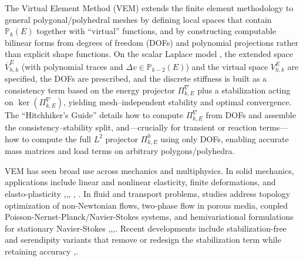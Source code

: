 \documentclass{article}
\newcommand{\scalmassproj}{\Pi^{0}_{k,E}}
\newcommand{\scalenergyproj}{\Pi^{\nabla}_{k,E}}
\begin{document}
The Virtual Element Method (VEM) extends the finite element methodology to general polygonal/polyhedral meshes by defining local spaces that contain $\mathbb{P}_k(E)$ together with “virtual” functions, and by constructing computable bilinear forms from degrees of freedom (DOFs) and polynomial projections rather than explicit shape functions. On the scalar Laplace model \cite{beirao2013vem}, the extended space $\overline{V}^E_{h,k}$ (with polynomial traces and $\Delta v \in \mathbb{P}_{k-2}(E)$) and the virtual space $V^E_{h,k}$ are specified, the DOFs are prescribed, and the discrete stiffness is built as a consistency term based on the energy projector $\scalenergyproj$ plus a stabilization acting on $\ker(\scalenergyproj)$, yielding mesh--independent stability and optimal convergence. The “Hitchhiker’s Guide” \cite{veiga2014hitchhiker} details how to compute $\scalenergyproj$ from DOFs and assemble the consistency--stability split, and—crucially for transient or reaction terms—how to compute the full $L^2$ projector $\scalmassproj$ using only DOFs, enabling accurate mass matrices and load terms on arbitrary polygons/polyhedra.

VEM has seen broad use across mechanics and multiphysics. In solid mechanics, applications include linear and nonlinear elasticity, finite deformations, and elasto-plasticity \cite{beirao2015elastic},\cite{artioli2017arbitrary},\cite{hudobivnik2019plasticity}, \cite{wriggers2017efficient}, \cite{vanhuyssteen2020isotropic}. In fluid and transport problems, studies address topology optimization of non-Newtonian flows, two-phase flow in porous media, coupled Poisson-Nernst-Planck/Navier-Stokes systems, and hemivariational formulations for stationary Navier-Stokes \cite{suarez2022topology},\cite{berrone2022twophase},\cite{dehghan2023poisson},\cite{han2021hemivariational}. Recent developments include stabilization-free and serendipity variants that remove or redesign the stabilization term while retaining accuracy \cite{chen2023stabilization},\cite{chen2023serendipity}.
\end{document}
